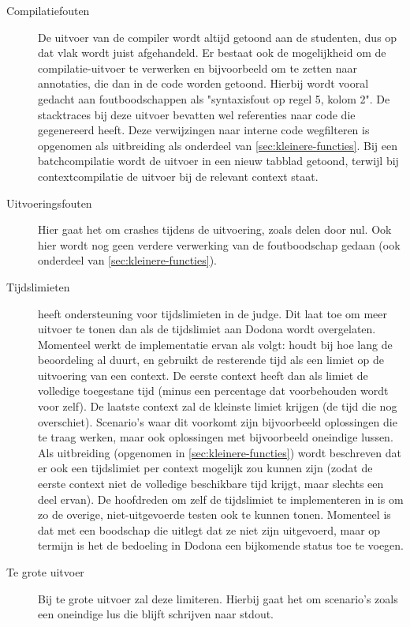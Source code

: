 \begin{description}
    \item[Compilatiefouten] De uitvoer van de compiler wordt altijd getoond aan de studenten, dus op dat vlak wordt juist afgehandeld.
    Er bestaat ook de mogelijkheid om de compilatie-uitvoer te verwerken en bijvoorbeeld om te zetten naar annotaties, die dan in de code worden getoond.
    Hierbij wordt vooral gedacht aan foutboodschappen als "syntaxisfout op regel 5, kolom 2".
    De stacktraces bij deze uitvoer bevatten wel referenties naar code die \tested{} gegenereerd heeft.
    Deze verwijzingen naar interne code wegfilteren is opgenomen als uitbreiding als onderdeel van \cref{sec:kleinere-functies}.
    Bij een batchcompilatie wordt de uitvoer in een nieuw tabblad getoond, terwijl bij contextcompilatie de uitvoer bij de relevant context staat.
    \item[Uitvoeringsfouten] Hier gaat het om crashes tijdens de uitvoering, zoals delen door nul.
    Ook hier wordt nog geen verdere verwerking van de foutboodschap gedaan (ook onderdeel van \cref{sec:kleinere-functies}).
    \item[Tijdslimieten] \tested{} heeft ondersteuning voor tijdslimieten in de judge.
    Dit laat toe om meer uitvoer te tonen dan als de tijdslimiet aan Dodona wordt overgelaten.
    Momenteel werkt de implementatie ervan als volgt: \tested{} houdt bij hoe lang de beoordeling al duurt, en gebruikt de resterende tijd als een limiet op de uitvoering van een context.
    De eerste context heeft dan als limiet de volledige toegestane tijd (minus een percentage dat voorbehouden wordt voor \tested{} zelf).
    De laatste context zal de kleinste limiet krijgen (de tijd die nog overschiet).
    Scenario's waar dit voorkomt zijn bijvoorbeeld oplossingen die te traag werken, maar ook oplossingen met bijvoorbeeld oneindige lussen.
    Als uitbreiding (opgenomen in \cref{sec:kleinere-functies}) wordt beschreven dat er ook een tijdslimiet per context mogelijk zou kunnen zijn (zodat de eerste context niet de volledige beschikbare tijd krijgt, maar slechts een deel ervan).
    De hoofdreden om zelf de tijdslimiet te implementeren in \tested{} is om zo de overige, niet-uitgevoerde testen ook te kunnen tonen.
    Momenteel is dat met een boodschap die uitlegt dat ze niet zijn uitgevoerd, maar op termijn is het de bedoeling in Dodona een bijkomende status toe te voegen.
    \item[Te grote uitvoer] Bij te grote uitvoer zal \tested{} deze limiteren.
    Hierbij gaat het om scenario's zoals een oneindige lus die blijft schrijven naar stdout.

\end{description}
